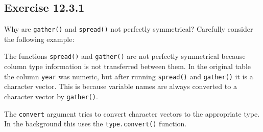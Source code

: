 \documentclass[]{book}
\newenvironment{Shaded}{\begin{snugshade}}{\end{snugshade}}
\newcommand{\CommentTok}[1]{\textcolor[rgb]{0.56,0.35,0.01}{\textit{#1}}}
\newcommand{\DataTypeTok}[1]{\textcolor[rgb]{0.13,0.29,0.53}{#1}}
\newcommand{\DecValTok}[1]{\textcolor[rgb]{0.00,0.00,0.81}{#1}}
\newcommand{\FloatTok}[1]{\textcolor[rgb]{0.00,0.00,0.81}{#1}}
\newcommand{\KeywordTok}[1]{\textcolor[rgb]{0.13,0.29,0.53}{\textbf{#1}}}
\newcommand{\NormalTok}[1]{#1}
\newcommand{\OperatorTok}[1]{\textcolor[rgb]{0.81,0.36,0.00}{\textbf{#1}}}
\newcommand{\StringTok}[1]{\textcolor[rgb]{0.31,0.60,0.02}{#1}}
\theoremstyle{plain}
\theoremstyle{remark}
\begin{document}
\hypertarget{exercise-12.3.1}{%
\subsection*{\texorpdfstring{Exercise
{12.3.1}}{Exercise 12.3.1}}\label{exercise-12.3.1}}

Why are \texttt{gather()} and \texttt{spread()} not perfectly
symmetrical? Carefully consider the following example:

\begin{Shaded}
\end{Shaded}

The functions \texttt{spread()} and \texttt{gather()} are not perfectly
symmetrical because column type information is not transferred between
them. In the original table the column \texttt{year} was numeric, but
after running \texttt{spread()} and \texttt{gather()} it is a character
vector. This is because variable names are always converted to a
character vector by \texttt{gather()}.

The \texttt{convert} argument tries to convert character vectors to the
appropriate type. In the background this uses the
\texttt{type.convert()} function.
\end{document}
